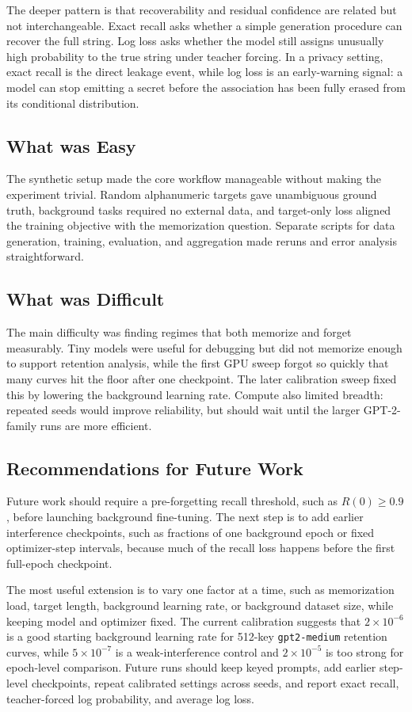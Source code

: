 \documentclass{article}
\begin{document}
The deeper pattern is that recoverability and residual confidence are related but not interchangeable. Exact recall asks whether a simple generation procedure can recover the full string. Log loss asks whether the model still assigns unusually high probability to the true string under teacher forcing. In a privacy setting, exact recall is the direct leakage event, while log loss is an early-warning signal: a model can stop emitting a secret before the association has been fully erased from its conditional distribution.

\subsection{What was Easy}
The synthetic setup made the core workflow manageable without making the experiment trivial. Random alphanumeric targets gave unambiguous ground truth, background tasks required no external data, and target-only loss aligned the training objective with the memorization question. Separate scripts for data generation, training, evaluation, and aggregation made reruns and error analysis straightforward.

\subsection{What was Difficult}
The main difficulty was finding regimes that both memorize and forget measurably. Tiny models were useful for debugging but did not memorize enough to support retention analysis, while the first GPU sweep forgot so quickly that many curves hit the floor after one checkpoint. The later calibration sweep fixed this by lowering the background learning rate. Compute also limited breadth: repeated seeds would improve reliability, but should wait until the larger GPT-2-family runs are more efficient.

\subsection{Recommendations for Future Work}
Future work should require a pre-forgetting recall threshold, such as $R(0) \geq 0.9$, before launching background fine-tuning. The next step is to add earlier interference checkpoints, such as fractions of one background epoch or fixed optimizer-step intervals, because much of the recall loss happens before the first full-epoch checkpoint.

The most useful extension is to vary one factor at a time, such as memorization load, target length, background learning rate, or background dataset size, while keeping model and optimizer fixed. The current calibration suggests that $2 \times 10^{-6}$ is a good starting background learning rate for 512-key \texttt{gpt2-medium} retention curves, while $5 \times 10^{-7}$ is a weak-interference control and $2 \times 10^{-5}$ is too strong for epoch-level comparison. Future runs should keep keyed prompts, add earlier step-level checkpoints, repeat calibrated settings across seeds, and report exact recall, teacher-forced log probability, and average log loss.
\end{document}
